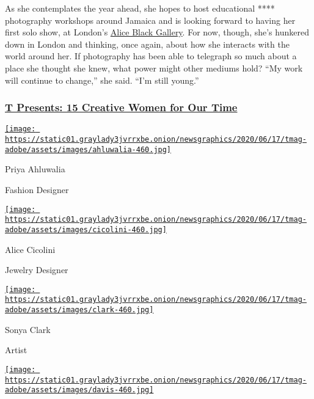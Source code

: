 As she contemplates the year ahead, she hopes to host educational ****
photography workshops around Jamaica and is looking forward to having
her first solo show, at London's
\href{https://www.aliceblackart.com/}{Alice Black Gallery}. For now,
though, she's hunkered down in London and thinking, once again, about
how she interacts with the world around her. If photography has been
able to telegraph so much about a place she thought she knew, what power
might other mediums hold? ``My work will continue to change,'' she said.
``I'm still young.''

\hypertarget{t-presents-15-creative-women-for-our-time}{%
\subsubsection{\texorpdfstring{\href{https://www.nytimes3xbfgragh.onion/interactive/2020/08/10/t-magazine/creative-women-designers-artists-chefs.html}{T
Presents: 15 Creative Women for Our
Time}}{T Presents: 15 Creative Women for Our Time}}\label{t-presents-15-creative-women-for-our-time}}

\href{https://www.nytimes3xbfgragh.onion/section/t-magazine}{}

\href{https://www.nytimes3xbfgragh.onion/2020/08/10/t-magazine/priya-ahluwalia-fashion-menswear.html}{\texttt{[image: https://static01.graylady3jvrrxbe.onion/newsgraphics/2020/06/17/tmag-adobe/assets/images/ahluwalia-460.jpg]}}

Priya Ahluwalia

Fashion Designer

\href{https://www.nytimes3xbfgragh.onion/2020/08/10/t-magazine/alice-cicolini-jewelry-art.html}{\texttt{[image: https://static01.graylady3jvrrxbe.onion/newsgraphics/2020/06/17/tmag-adobe/assets/images/cicolini-460.jpg]}}

Alice Cicolini

Jewelry Designer

\href{https://nytimes3xbfgragh.onion/2020/08/10/t-magazine/sonya-clark-flags-art.html}{\texttt{[image: https://static01.graylady3jvrrxbe.onion/newsgraphics/2020/06/17/tmag-adobe/assets/images/clark-460.jpg]}}

Sonya Clark

Artist

\href{https://www.nytimes3xbfgragh.onion/2020/08/10/t-magazine/pierre-davis-no-sesso.html}{\texttt{[image: https://static01.graylady3jvrrxbe.onion/newsgraphics/2020/06/17/tmag-adobe/assets/images/davis-460.jpg]}}

